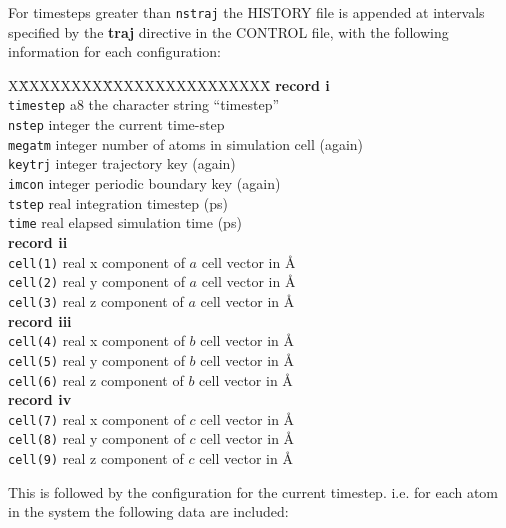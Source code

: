 For timesteps greater than {\tt nstraj} the HISTORY file is
appended at intervals specified by the {\bf traj} directive in the
CONTROL file, with the following information for each
configuration:
\begin{tabbing}
X\=XXXXXXXX\=XXXXXXXXXXXXXXXX\=\kill
{\bf record i} \\
\> {\tt timestep} \> a8      \> the character string ``timestep'' \\
\> {\tt nstep}    \> integer \> the current time-step \\
\> {\tt megatm}   \> integer \> number of atoms in simulation cell (again) \\
\> {\tt keytrj}   \> integer \> trajectory key (again) \\
\> {\tt imcon}    \> integer \> periodic boundary key (again) \\
\> {\tt tstep}    \> real    \> integration timestep (ps) \\
\> {\tt time}     \> real    \> elapsed simulation time (ps) \\
{\bf record ii} \\
\> {\tt cell(1)}  \> real    \> x component of $a$ cell vector in \AA \\
\> {\tt cell(2)}  \> real    \> y component of $a$ cell vector in \AA \\
\> {\tt cell(3)}  \> real    \> z component of $a$ cell vector in \AA \\
{\bf record iii} \\
\> {\tt cell(4)}  \> real    \> x component of $b$ cell vector in \AA \\
\> {\tt cell(5)}  \> real    \> y component of $b$ cell vector in \AA \\
\> {\tt cell(6)}  \> real    \> z component of $b$ cell vector in \AA \\
{\bf record iv} \\
\> {\tt cell(7)}  \> real    \> x component of $c$ cell vector in \AA \\
\> {\tt cell(8)}  \> real    \> y component of $c$ cell vector in \AA \\
\> {\tt cell(9)}  \> real    \> z component of $c$ cell vector in \AA
\end{tabbing}
This is followed by the configuration for the current timestep. i.e.
for each atom in the system the following data are included:
